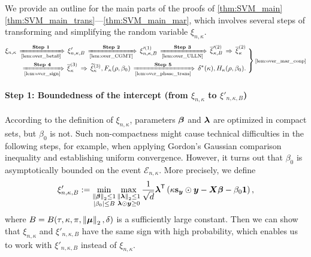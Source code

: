 We provide an outline for the main parts of the proofs of \cref{thm:SVM_main}\ref{thm:SVM_main_trans}---\ref{thm:SVM_main_mar}, which involves several steps of transforming and simplifying the random variable $\xi_{n, \kappa}$.
\begin{equation*}
\begin{aligned}
    \xi_{n, \kappa}
    \, \xRightarrow[\text{\cref{lem:over_beta0}}]{\textbf{Step 1}} \, 
    \xi'_{n, \kappa, B}
    \, \xRightarrow[\text{\cref{lem:over_CGMT}}]{\textbf{Step 2}} \, 
    \xi'^{(1)}_{n, \kappa, B}
    \, \xRightarrow[\text{\cref{lem:over_ULLN}}]{\textbf{Step 3}} \, 
    \bar\xi'^{(2)}_{\kappa, B}
    \, \Rightarrow \,
    \bar\xi_{\kappa}^{(2)}
    \\
    \xRightarrow[\text{\cref{lem:over_sign}}]{\textbf{Step 4}} \, 
    \bar\xi_{\kappa}^{(3)}
    \, \Rightarrow \,
    \wt\xi_{\kappa}^{(3)}, F_\kappa(\rho, \beta_0)
    \, \xRightarrow[\text{\cref{lem:over_phase_trans}}]{\textbf{Step 5}} \, 
    \delta^*(\kappa), H_\kappa(\rho, \beta_0).
\end{aligned}
\left.
\vphantom{\begin{matrix} \dfrac12 \\ \dfrac12 \end{matrix}}
\right\} \text{\scriptsize{\cref{lem:over_mar_conp}}}
\end{equation*}

\paragraph{Step 1: Boundedness of the intercept (from $\xi_{n, \kappa}$ to $\xi'_{n, \kappa, B}$)} 
According to the definition of $\xi_{n, \kappa}$, parameters ${\boldsymbol{\beta}}$ and $\text{\boldmath $\lambda$}$ are optimized in compact sets, but $\beta_0$ is not. Such non-compactness might cause technical difficulties in the following steps, for example, when applying Gordon's Gaussian comparison inequality and establishing uniform convergence. However, it turns out that $\beta_0$ is asymptotically bounded on the event $\mathcal{E}_{n ,\kappa}$. More precisely, we define
\begin{equation}
    \label{eq:xi'_n_kappa_B}
    \xi'_{n, \kappa, B} := \min_{ \substack{ \left\|{{\boldsymbol{\beta}}}\right\|_2 \le 1 \\ \left|{\beta_0}\right| \le B } } \max_{ \substack{ \left\|{\text{\boldmath $\lambda$}}\right\|_2 \le 1 \\ \text{\boldmath $\lambda$} \odot \text{\boldmath $y$} \ge 0} } \frac{1}{\sqrt{d}} \text{\boldmath $\lambda$}^{\sf T} \left( \kappa \mathrm{\bf s}_{\text{\boldmath $y$}} \odot \text{\boldmath $y$} - \text{\boldmath $X$} {\boldsymbol{\beta}}  - \beta_0 \mathrm{\bf 1} \right),
\end{equation}
where $B = B(\tau, \kappa, \pi, \left\|{\text{\boldmath $\mu$}}\right\|_2, \delta)$ is a sufficiently large constant. Then we can show that $\xi_{n, \kappa}$ and $\xi'_{n, \kappa, B}$ have the same sign with high probability, which enables us to work with $\xi'_{n, \kappa, B}$ instead of $\xi_{n, \kappa}$.

